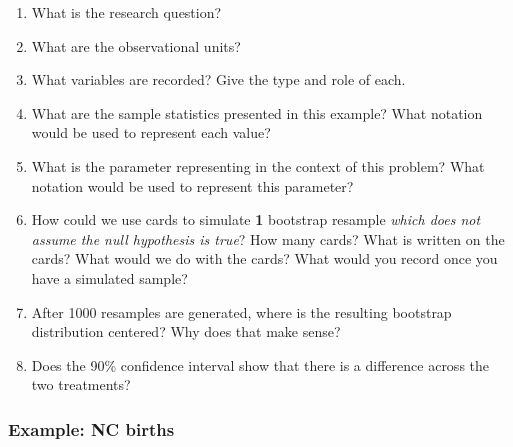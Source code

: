 \documentclass[
]{report}
\newcommand{\rgs}{\vspace{12pt}} %
\begin{document}
\begin{enumerate}
\def\labelenumi{\arabic{enumi}.}
\item
  What is the research question?
  \rgs
\item
  What are the observational units?
  \rgs
\item
  What variables are recorded? Give the type and role of each.
  \rgs
  \rgs
\item
  What are the sample statistics presented in this example? What notation would be used to represent each value?
  \rgs
\item
  What is the parameter representing in the context of this problem? What notation would be used to represent this parameter?
  \rgs
  \rgs
\item
  How could we use cards to simulate \textbf{1} bootstrap resample \emph{which does not assume the null hypothesis is true}? How many cards? What is written on the cards? What would we do with the cards? What would you record once you have a simulated sample?
  \rgs
  \rgs
\item
  After 1000 resamples are generated, where is the resulting bootstrap distribution centered? Why does that make sense?
  \rgs
  \rgs
\item
  Does the 90\% confidence interval show that there is a difference across the two treatments?
  \rgs
  \rgs
\end{enumerate}

\hypertarget{example-nc-births}{%
\subsubsection*{Example: NC births}\label{example-nc-births}}
\end{document}
